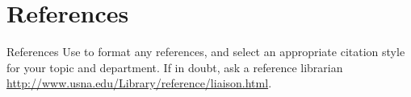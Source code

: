 \documentclass[pdf]{beamer}
\begin{document}
\begin{frame}{}
\begin{columns}[T,totalwidth=\textwidth]
\begin{column}{9.5in}
\begin{minipage}[t][\textheight]{\linewidth}
\section*{References}
\begin{block}{References}
Use  to format any references, and select an appropriate citation style for your topic and department. If in doubt, ask a reference librarian \href{http://www.usna.edu/Library/reference/liaison.html}{http://www.usna.edu/Library/reference/liaison.html}.
\vspace*{0.5in}
\end{block}
\end{minipage}
\end{column}

\end{columns}
\end{frame}
\end{document}
